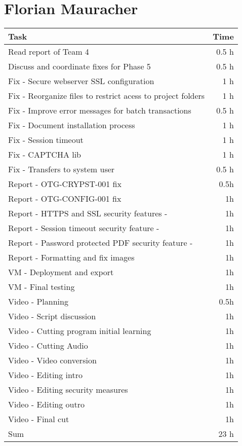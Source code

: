 \clearpage
\section*{Florian Mauracher}
\begin{table}[h!tpb]
  \centering
  \begin{tabularx}{\textwidth}{X r}
    \toprule
      Task & Time \\
    \midrule
      Read report of Team 4 & 0.5 h \\
      Discuss and coordinate fixes for Phase 5  & 0.5 h \\
      Fix - Secure webserver SSL configuration & 1 h \\
      Fix - Reorganize files to restrict acess to project folders & 1 h \\
      Fix - Improve error messages for batch transactions & 0.5 h \\
      Fix - Document installation process & 1 h \\
      Fix - Session timeout & 1 h \\
	  Fix - CAPTCHA lib & 1 h \\
      Fix - Transfers to system user & 0.5 h \\
	  Report - OTG-CRYPST-001 fix & 0.5h \\
	  Report - OTG-CONFIG-001 fix & 1h \\
	  Report - HTTPS and SSL security features - & 1h \\
	  Report - Session timeout security feature - & 1h \\
	  Report - Password protected PDF security feature - & 1h \\
	  Report - Formatting and fix images & 1h \\
	  VM - Deployment and export & 1h \\
	  VM - Final testing & 1h \\
	  Video - Planning & 0.5h \\
	  Video - Script discussion & 1h \\
	  Video - Cutting program initial learning & 1h \\
	  Video - Cutting Audio & 1h \\
	  Video - Video conversion & 1h \\
	  Video - Editing intro & 1h \\
	  Video - Editing security measures & 1h \\
	  Video - Editing outro & 1h \\
	  Video - Final cut & 1h \\
    \midrule
      Sum & 23 h \\
    \bottomrule
  \end{tabularx}
\end{table}

